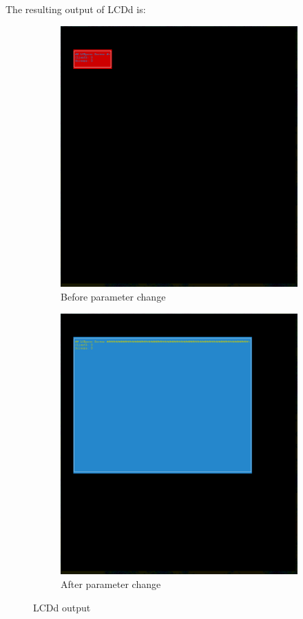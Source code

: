 \documentclass[12pt]{report}
\begin{document}
The resulting output of LCDd is:
\FloatBarrier
\begin{figure}[h!]
	\centering
	\begin{subfigure}[b]{0.4\linewidth}
		\includegraphics[width=\linewidth]{lcdd_vanilla.png}
		\caption{Before parameter change}
	\end{subfigure}
	\begin{subfigure}[b]{0.4\linewidth}
		\includegraphics[width=\linewidth]{lcdd_changed.png}
		\caption{After parameter change}
	\end{subfigure}
  \caption{LCDd output}
\label{fig:lcdd}
\end{figure}
\end{document}

